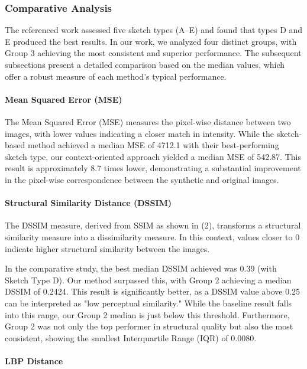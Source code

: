 \documentclass{ieeeaccess}
\begin{document}
\subsubsection{Comparative Analysis}

The referenced work assessed five sketch types (A--E) and found that types D and E produced the best results. In our work, we analyzed four distinct groups, with Group 3 achieving the most consistent and superior performance. The subsequent subsections present a detailed comparison based on the median values, which offer a robust measure of each method's typical performance.
\paragraph{Mean Squared Error (MSE)}

The Mean Squared Error (MSE) measures the pixel-wise distance between two images, with lower values indicating a closer match in intensity. While the sketch-based method achieved a median MSE of 4712.1 with their best-performing sketch type, our context-oriented approach yielded a median MSE of 542.87. This result is approximately 8.7 times lower, demonstrating a substantial improvement in the pixel-wise correspondence between the synthetic and original images.
\paragraph{Structural Similarity Distance (DSSIM)}

The DSSIM measure, derived from SSIM as shown in (2), transforms a structural similarity measure into a dissimilarity measure. In this context, values closer to 0 indicate higher structural similarity between the images.

In the comparative study, the best median DSSIM achieved was 0.39 (with Sketch Type D). Our method surpassed this, with Group 2 achieving a median DSSIM of 0.2424. This result is significantly better, as a DSSIM value above 0.25 can be interpreted as "low perceptual similarity." While the baseline result falls into this range, our Group 2 median is just below this threshold. Furthermore, Group 2 was not only the top performer in structural quality but also the most consistent, showing the smallest Interquartile Range (IQR) of 0.0080.
\paragraph{LBP Distance}
\end{document}
